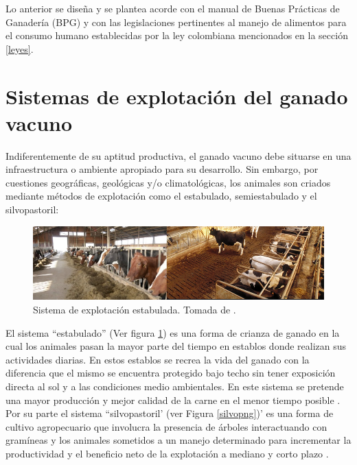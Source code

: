 Lo anterior se diseña y se plantea acorde con el manual de Buenas Prácticas de Ganadería  (BPG) y con las legislaciones pertinentes al manejo de alimentos para el consumo humano establecidas por la ley colombiana mencionados en la sección \ref{leyes}.


\section{Sistemas de explotación del ganado vacuno}

Indiferentemente de su aptitud productiva, el ganado vacuno debe situarse en una infraestructura o ambiente apropiado para su desarrollo. Sin embargo, por  cuestiones geográficas, geológicas y/o climatológicas, los animales son criados mediante métodos de explotación como el estabulado, semiestabulado y el silvopastoril:\\

\begin{figure}[H]
 \begin{center}
 \includegraphics[scale=0.8]{img/estabulado.png}
 \end{center}
 \caption{Sistema de explotación estabulada. Tomada de \cite{googlepics}. \label{estabulpng}}
\end{figure}

El sistema ``estabulado'' (Ver figura \ref{estabulpng}) es una forma de crianza de ganado en la cual los animales pasan la mayor parte del tiempo en establos donde realizan sus actividades diarias. En estos establos se recrea la vida del ganado con la diferencia que el mismo se encuentra protegido bajo techo sin tener exposición directa al sol y a las condiciones medio ambientales. En este sistema se pretende una mayor producción y mejor calidad de la carne en el menor tiempo posible \cite{defestabulacion}.\\

 Por su parte el sistema ``silvopastoril' (ver Figura \ref{silvopng})' es una forma de cultivo agropecuario que involucra la presencia de árboles interactuando con gramíneas y los animales sometidos a un manejo determinado para incrementar la productividad y el beneficio neto de la explotación a mediano y corto plazo \cite{defsilvopas}.

